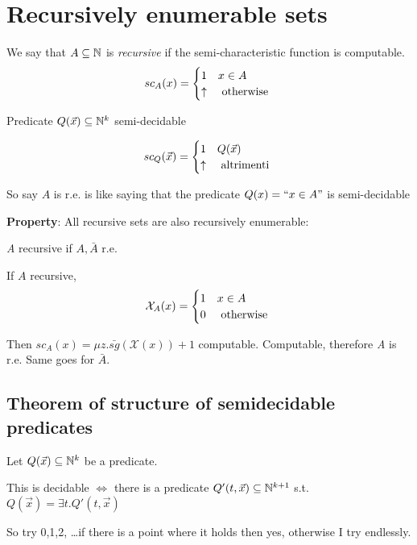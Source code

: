 \chapter{Recursively enumerable sets}
We say that $ A \subseteq \mathbb{N} $ is \emph{recursive} if
the semi-characteristic function is computable.
\begin{equation*}
  sc_A(x) = \begin{cases} 1 & x \in A \\ \uparrow & $
    otherwise $
  \end{cases}
\end{equation*}

Predicate $ Q(\vec{x}) \subseteq \mathbb{N}^k $ semi-decidable

\begin{equation*} sc_Q(\vec{x}) = \begin{cases} 1 & Q(\vec{x}) \\
    \uparrow & $ altrimenti $
  \end{cases}
\end{equation*}

So say $A$ is r.e. is like saying that the predicate $ Q(x)=``x \in A"
$ is semi-decidable

\textbf{Property}: All recursive sets are also recursively
enumerable:

\textit{A} recursive if $ A, \bar{A} $ r.e.

If $A$ recursive,
\begin{equation*}
  \mathcal{X}_A(x)= \begin{cases}
    1 & x\in A \\
    0 & $ otherwise $
  \end{cases}
\end{equation*}

Then $ sc_A(x) = \mu z.\bar{sg}(\mathcal{X}(x)) + 1 $
computable. Computable, therefore \textit{A} is r.e. Same goes for $
\bar{A} $.

\section {Theorem of structure of semidecidable predicates}

Let $ Q(\vec{x}) \subseteq \mathbb{N}^k $ be a predicate.

This is decidable $ \Leftrightarrow $ there is a predicate $
Q'(t,\vec{x}) \subseteq \mathbb{N}^{k+1} $ s.t. $ Q(\vec{x}) = \exists
t. Q'(t,\vec{x}) $

So try 0,1,2, \dots if there is a point where it holds then yes,
otherwise I try endlessly.

